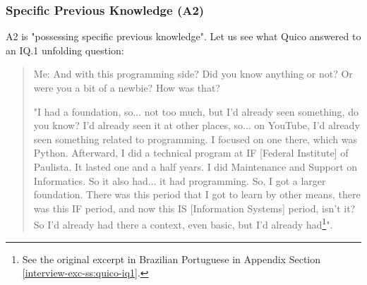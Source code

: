 \subsubsection{Specific Previous Knowledge (A2)}

\gls{A}2 is "possessing specific previous knowledge". Let us see what Quico answered to an \acrshort{IQ}.1 unfolding question:
\begin{quote}
    \colorbox{black!15}{Me: And with this programming side? Did you know anything or not? Or were you} \colorbox{black!15}{a bit of a newbie? How was that?}

    "I had a foundation, so... not too much, but I'd already seen something, do you know? I'd already seen it at other places, so... on YouTube, I'd already seen something related to programming. I focused on one there, which was Python. Afterward, I did a technical program at IF [Federal Institute] of Paulista. It lasted one and a half years. I did Maintenance and Support on Informatics. So it also had... it had programming. So, I got a larger foundation. There was this period that I got to learn by other means, there was this IF period, and now this IS [Information Systems] period, isn't it? So I'd already had there a context, even basic, but I'd already had\footnote{See the original excerpt in Brazilian Portuguese in Appendix Section \ref{interview-exc-ss:quico-iq1}.}".
\end{quote}

